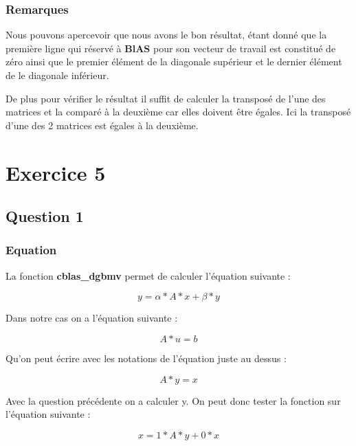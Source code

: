\documentclass[11pt]{article}
\begin{document}
\subsubsection{Remarques}

Nous pouvons apercevoir que nous avons le bon résultat, étant donné
que la première ligne qui réservé à \textbf{BlAS} pour son vecteur de
travail est constitué de zéro ainsi que le premier élément de la
diagonale supérieur et le dernier élément de le diagonale
inférieur.\newline

De plus pour vérifier le résultat il suffit de calculer la transposé
de l'une des matrices et la comparé à la deuxième car elles doivent
être égales. Ici la transposé d'une des 2 matrices est égales à la
deuxième.

\section{Exercice 5}

\subsection{Question 1}

\subsubsection{Equation}

La fonction \textbf{cblas\_dgbmv} permet de calculer l'équation
suivante :

\begin{equation*}
y = \alpha * A * x + \beta * y
\end{equation*}

Dans notre cas on a l'équation suivante :

\begin{equation*}
A * u = b
\end{equation*}

Qu'on peut écrire avec les notations de l'équation juste au dessus :

\begin{equation*}
A * y = x
\end{equation*}

Avec la question précédente on a calculer y. On peut donc tester la
fonction sur l'équation suivante :

\begin{equation*}
x = 1 * A * y + 0 * x
\end{equation*}
\end{document}
